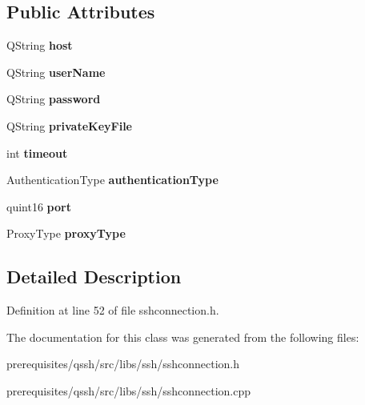 \subsection*{Public Attributes}
\begin{DoxyCompactItemize}
\item 
\mbox{\label{class_q_ssh_1_1_ssh_connection_parameters_a7cd7f52d1851d40e590b3712016d2557}} 
Q\+String {\bfseries host}
\item 
\mbox{\label{class_q_ssh_1_1_ssh_connection_parameters_a029ebd319bfc86e16b113fcedbb0bfac}} 
Q\+String {\bfseries user\+Name}
\item 
\mbox{\label{class_q_ssh_1_1_ssh_connection_parameters_aae1714566e2942ab527ce6ad81e366b3}} 
Q\+String {\bfseries password}
\item 
\mbox{\label{class_q_ssh_1_1_ssh_connection_parameters_a2c4e74759aacbc5cdb4435bdb830a635}} 
Q\+String {\bfseries private\+Key\+File}
\item 
\mbox{\label{class_q_ssh_1_1_ssh_connection_parameters_aaa199c42fbb0b57ce4be3e43dde62810}} 
int {\bfseries timeout}
\item 
\mbox{\label{class_q_ssh_1_1_ssh_connection_parameters_a3571241956ea67099eb33118e55e6837}} 
Authentication\+Type {\bfseries authentication\+Type}
\item 
\mbox{\label{class_q_ssh_1_1_ssh_connection_parameters_a064b6a520657720229d6725f7ce4cb45}} 
quint16 {\bfseries port}
\item 
\mbox{\label{class_q_ssh_1_1_ssh_connection_parameters_a886a489c1b6c46c94f70563dfdcfd518}} 
Proxy\+Type {\bfseries proxy\+Type}
\end{DoxyCompactItemize}


\subsection{Detailed Description}


Definition at line 52 of file sshconnection.\+h.



The documentation for this class was generated from the following files\+:\begin{DoxyCompactItemize}
\item 
prerequisites/qssh/src/libs/ssh/sshconnection.\+h\item 
prerequisites/qssh/src/libs/ssh/sshconnection.\+cpp\end{DoxyCompactItemize}
